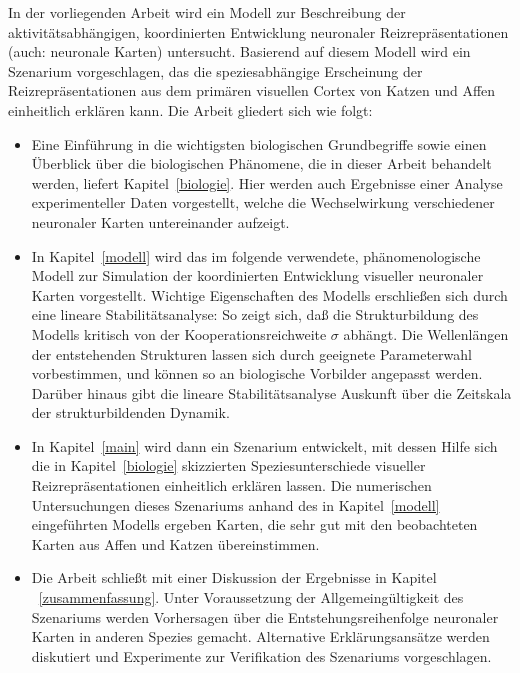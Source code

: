 In der vorliegenden Arbeit wird ein Modell zur Beschreibung der
aktivitätsabhängigen, koordinierten Entwicklung neuronaler
Reizrepräsentationen (auch: neuronale Karten) untersucht.  Basierend auf
diesem Modell wird ein Szenarium vorgeschlagen, das die speziesabhängige
Erscheinung der Reizrepräsentationen aus dem primären visuellen Cortex
von Katzen und Affen einheitlich erklären kann.  Die Arbeit gliedert sich
wie folgt:

\begin{itemize}
\item Eine Einführung in die wichtigsten biologischen Grundbegriffe sowie
einen Über\-blick über die biologischen Phänomene, die in dieser Arbeit
behandelt werden, liefert Kapitel~\ref{biologie}. Hier werden auch
Ergebnisse einer Analyse experimenteller Daten vorgestellt, welche die
Wechselwirkung verschiedener neuronaler Karten untereinander aufzeigt.

\item In Kapitel~\ref{modell} wird das im folgende verwendete,
phänomenologische Modell zur Simulation der koordinierten Entwicklung
visueller neuronaler Karten vorgestellt. Wichtige Eigenschaften des Modells
erschließen sich durch eine lineare Stabilitätsanalyse: So zeigt sich,
daß die Strukturbildung des Modells kritisch von der
Kooperationsreichweite $\sigma$ abhängt.  Die Wellenlängen der
entstehenden Strukturen lassen sich durch geeignete Parameterwahl
vorbestimmen, und können so an biologische Vorbilder angepasst werden.
Darüber hinaus gibt die lineare Stabilitätsanalyse Auskunft über die
Zeitskala der strukturbildenden Dynamik.

\item In Kapitel~\ref{main} wird dann ein Szenarium entwickelt, mit dessen
Hilfe sich die in Kapitel~\ref{biologie} skizzierten Speziesunterschiede
visueller Reizrepräsentationen einheitlich erklären lassen.  Die
numerischen Untersuchungen dieses Szenariums anhand des in
Kapitel~\ref{modell} eingeführten Modells ergeben Karten, die sehr gut mit
den beobachteten Karten aus Affen und Katzen übereinstimmen.

\item Die Arbeit schließt mit einer Diskussion der Ergebnisse in Kapitel
~\ref{zusammenfassung}. Unter Voraussetzung der Allgemeingültigkeit des
Szenariums werden Vorhersagen über die Entstehungsreihenfolge neuronaler
Karten in anderen Spezies gemacht. Alternative Erklärungsansätze werden
diskutiert und Experimente zur Verifikation des Szenariums vorgeschlagen.
\end{itemize}
